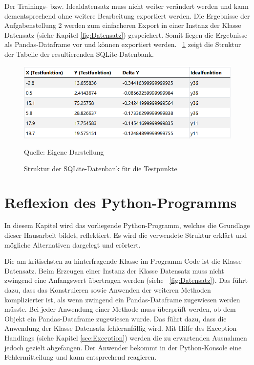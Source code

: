 \documentclass[
    a4paper, 								%
    oneside, 								%
    11pt, 									%
    listof=totoc, 					%
    bibliography=totoc, 		%
    final, 									%
    numbers=noenddot
]{scrreprt}
\newcommand{\abbildung}[1]{\figurename\ \ref{#1}}
\begin{document}
Der Trainings- bzw. Idealdatensatz muss nicht weiter verändert werden und kann dementsprechend ohne weitere Bearbeitung exportiert werden. Die Ergebnisse der Aufgabenstellung 2 werden zum einfacheren Export in einer Instanz der Klasse Datensatz (siehe Kapitel \ref{fig:Datensatz}) gespeichert. Somit liegen die Ergebnisse als Pandas-Dataframe vor und können exportiert werden. \abbildung{fig:DBTestpunkte} zeigt die Struktur der Tabelle der resultierenden SQLite-Datenbank. 
\begin{figure}[!h]
	\centering
	\caption{Struktur der SQLite-Datenbank für die Testpunkte}
	\vspace{6pt}
	\includegraphics[scale=0.9]{Datenbank_2}
	\vspace{6pt}
	
	Quelle: Eigene Darstellung
	\label{fig:DBTestpunkte}
\end{figure}

\chapter{Reflexion des Python-Programms}
\label{cha:Reflexion}
In diesem Kapitel wird das vorliegende Python-Programm, welches die Grundlage dieser Hausarbeit bildet, reflektiert. Es wird die verwendete Struktur erklärt und mögliche Alternativen dargelegt und erörtert. 

Die am kritischsten zu hinterfragende Klasse im Programm-Code ist die Klasse Datensatz. Beim Erzeugen einer Instanz der Klasse Datensatz muss nicht zwingend eine Anfangswert übertragen werden (siehe \abbildung{fig:Datensatz}). Das führt dazu, dass das Konstruieren sowie Anwenden der weiteren Methoden komplizierter ist, als wenn zwingend ein Pandas-Dataframe zugewiesen werden müsste. Bei jeder Anwendung einer Methode muss überprüft werden, ob dem Objekt ein Pandas-Dataframe zugewiesen wurde. Das führt dazu, dass die Anwendung der Klasse Datensatz fehleranfällig wird. Mit Hilfe des Exception-Handlings (siehe Kapitel \ref{sec:Exception}) werden die zu erwartenden Ausnahmen jedoch gezielt abgefangen. Der Anwender bekommt in der Python-Konsole eine Fehlermitteilung und kann entsprechend reagieren.
\end{document}

